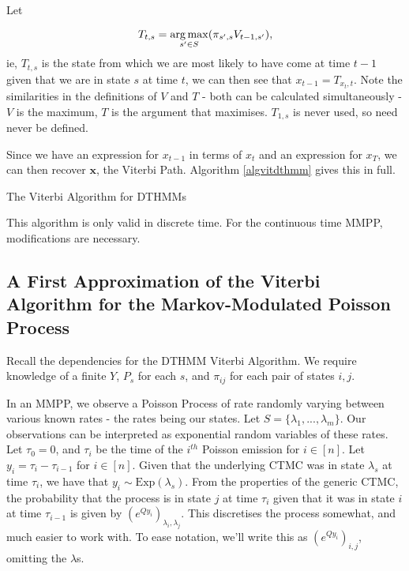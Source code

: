 Let
 
$$
T_{t,s} = \operatorname*{arg\,max}_{s'\in S}(\pi_{s',s}V_{t-1,s'}),
$$
ie, $T_{t,s}$ is the state from which we are most likely to have come at time $t-1$ given that we are in state $s$ at time $t$, we can then see that $x_{t-1} = T_{x_t,t}$. Note the similarities in the definitions of $V$ and $T$ - both can be calculated simultaneously - $V$ is the maximum, $T$ is the argument that maximises. $T_{1,s}$ is never used, so need never be defined. 

Since we have an expression for $x_{t-1}$ in terms of $x_t$ and an expression for $x_T$, we can then recover $\mathbf{x}$, the Viterbi Path. Algorithm \ref{algvitdthmm} gives this in full.

\begin{algorithm}
\SetAlgoLined
{}

\caption{The Viterbi Algorithm for DTHMMs}\label{algvitdthmm}

\end{algorithm}

This algorithm is only valid in discrete time. For the continuous time MMPP, modifications are necessary.

\subsection{A First Approximation of the Viterbi Algorithm for the Markov-Modulated Poisson Process}

Recall the dependencies for the DTHMM Viterbi Algorithm. We require knowledge of a finite $Y$, $P_s$ for each $s$, and $\pi_{ij}$ for each pair of states $i,j$.

In an MMPP, we observe a Poisson Process of rate randomly varying between various known rates - the rates being our states. Let $S = \{\lambda_1,...,\lambda_m\}$. Our observations can be interpreted as exponential random variables of these rates. Let $\tau_0 = 0$, and $\tau_i$ be the time of the $i^{th}$ Poisson emission for $i \in [n]$. Let $y_i = \tau_i-\tau_{i-1}$ for $i \in [n]$. Given that the underlying CTMC was in state $\lambda_s$ at time $\tau_i$, we have that $y_i \sim \mathrm{Exp} (\lambda_s)$. From the properties of the generic CTMC, the probability that the process is in state $j$ at time $\tau_i$ given that it was in state $i$ at time $\tau_{i-1}$ is given by $(e^{Qy_i})_{\lambda_{i},\lambda_{j}}$. This discretises the process somewhat, and much easier to work with. To ease notation, we'll write this as $(e^{Qy_i})_{i,j}$, omitting the $\lambda$s.

